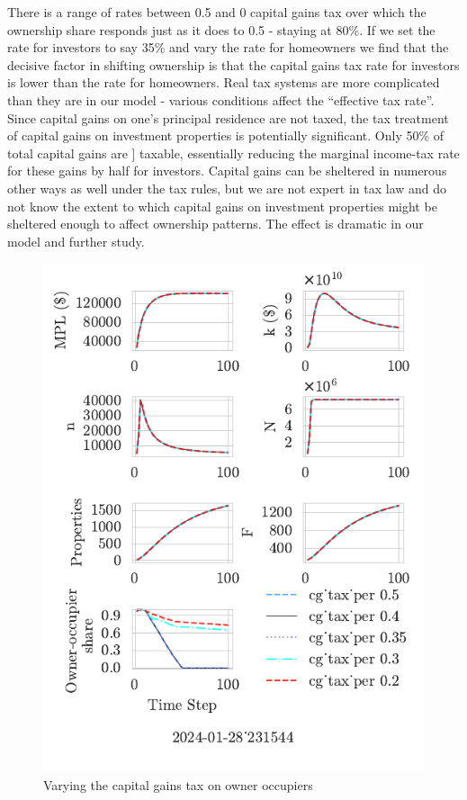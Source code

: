 There is a range of rates between 0.5 and 0 capital gains tax over which the ownership share responds just as it does to 0.5 -  staying at 80\%. If we set the rate for investors to say 35\% and vary the rate for homeowners we find that the decisive factor in shifting ownership is that the capital gains tax rate for investors is lower than the rate for homeowners.  Real tax systems are more complicated than they are in our model - various conditions affect the ``effective tax rate''. Since capital gains on one's principal residence are not taxed, the tax treatment of capital gains on investment properties is potentially significant. Only 50\% of total capital gains are ] taxable, essentially reducing the marginal income-tax rate for these gains by half for investors. Capital gains can be sheltered in numerous other ways as well under the tax rules, but we are not expert in tax law and do not know the extent to which capital gains on investment properties might be sheltered enough to affect ownership patterns. The effect is dramatic in our model and further study.%

\begin{figure}
    \centering
  \includegraphics{fig/Analysis/cg_tax_per-2024-01-28_231544}
    \caption{Varying the capital gains tax on owner occupiers}
    \label{fig:enter-label}
\end{figure}



